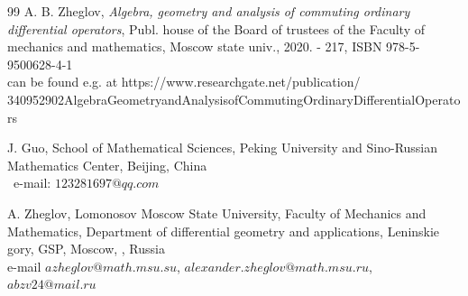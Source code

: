 \documentclass[11pt]{article}
\theoremstyle{definition}
\theoremstyle{plain}
\numberwithin{equation}{section}
\begin{document}
\begin{thebibliography}{99}
 A. B. Zheglov, {\em Algebra, geometry and analysis of commuting ordinary differential operators}, Publ. house of the Board of trustees of the Faculty of mechanics and mathematics, Moscow state univ., 2020. - 217,  ISBN 978-5-9500628-4-1\\ 
can be found e.g. at 
https://www.researchgate.net/publication/\\
340952902AlgebraGeometryandAnalysisofCommutingOrdinaryDifferentialOperators 





\end{thebibliography}

\noindent J. Guo,  School of Mathematical Sciences, Peking University and Sino-Russian Mathematics Center,  Beijing, China 
\\ 
\noindent\ e-mail:
$123281697@qq.com$

\vspace{0.5cm}

\noindent A. Zheglov,  Lomonosov Moscow State  University, Faculty
of Mechanics and Mathematics, Department of differential geometry
and applications, Leninskie gory, GSP, Moscow, ,
Russia
\\ \noindent e-mail
 $azheglov@math.msu.su$, $alexander.zheglov@math.msu.ru$, $abzv24@mail.ru$
\end{document}
